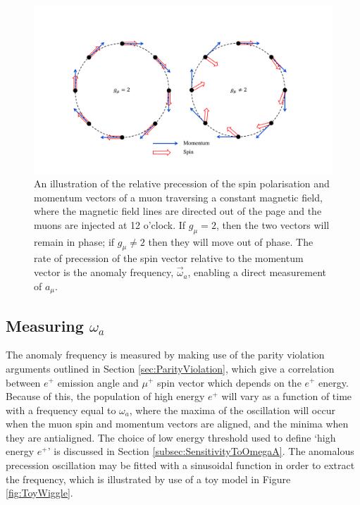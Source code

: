 \begin{figure}[t!]
\centering{}
\includegraphics[trim={2cm 2cm 2cm 2cm},clip,width=\textwidth]{Images/Chapter2/AnomalyFrequencyCartoon.pdf}
\caption{An illustration of the relative precession of the spin polarisation and momentum vectors of a muon traversing a constant magnetic field, where the magnetic field lines are directed out of the page and the muons are injected at 12 o'clock. If $g_{\mu}=2$, then the two vectors will remain in phase; if $g_{\mu}\neq2$ then they will move out of phase. The rate of precession of the spin vector relative to the momentum vector is the anomaly frequency, $\vec{\omega}_{a}$, enabling a direct measurement of $a_{\mu}$.} 
\label{fig:AnomalyFreq}
\end{figure}

\subsection{Measuring $\omega_{a}$}

The anomaly frequency is measured by making use of the parity violation arguments outlined in Section \ref{sec:ParityViolation}, which give a correlation between $e^{+}$ emission angle and $\mu^{+}$ spin vector which depends on the $e^{+}$ energy. Because of this, the population of high energy $e^{+}$ will vary as a function of time with a frequency equal to $\omega_{a}$, where the maxima of the oscillation will occur when the muon spin and momentum vectors are aligned, and the minima when they are antialigned. The choice of low energy threshold used to define `high energy $e^{+}$' is discussed in Section \ref{subsec:SensitivityToOmegaA}. The anomalous precession oscillation may be fitted with a sinusoidal function in order to extract the frequency, which is illustrated by use of a toy model in Figure \ref{fig:ToyWiggle}. 

